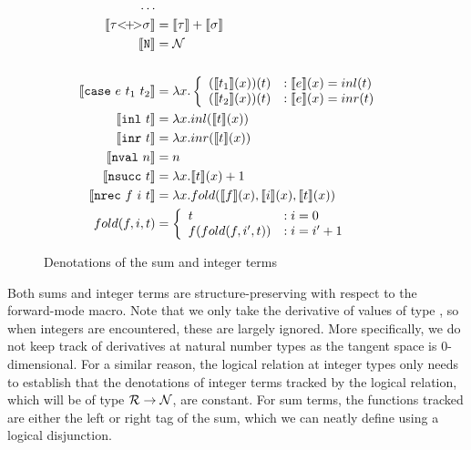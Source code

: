   \begin{figure}
    \centering
    \begin{equation*}
      \begin{split}
        \dots \\
        \llbracket \tau {<}\!{+}\!{>} \sigma \rrbracket &= \llbracket \tau \rrbracket + \llbracket \sigma \rrbracket \\
        \llbracket \texttt{N} \rrbracket &= \mathcal{N} \\
        \\
        \llbracket \texttt{case}\ e\ t_1\ t_2 \rrbracket &= \lambda x.
          \left\{
            \begin{array}{ll}
              (\llbracket t_1 \rrbracket(x))(t)
                & : \llbracket e \rrbracket(x) = inl(t) \\
              (\llbracket t_2 \rrbracket(x))(t)
                & : \llbracket e \rrbracket(x) = inr(t) \\
            \end{array}
          \right. \\
        \llbracket \texttt{inl}\ t \rrbracket &= \lambda x. inl(\llbracket t \rrbracket(x)) \\
        \llbracket \texttt{inr}\ t \rrbracket &= \lambda x. inr(\llbracket t \rrbracket(x)) \\
        \llbracket \texttt{nval}\ n \rrbracket &= n \\
        \llbracket \texttt{nsucc}\ t \rrbracket &= \lambda x. \llbracket t \rrbracket(x) + 1 \\
        \llbracket \texttt{nrec}\ f\ i\ t \rrbracket &= \lambda x. fold(\llbracket f \rrbracket(x), \llbracket i \rrbracket(x), \llbracket t \rrbracket(x)) \\
        fold(f, i, t) &=
          \left\{
            \begin{array}{ll}
              t &: i = 0 \\
              f(fold(f, i', t))
                &: i = i' + 1 \\
            \end{array}
          \right. \\
      \end{split}
    \end{equation*}
    \caption{Denotations of the sum and integer terms}
    \label{eqn:denotation_sums_prim}
  \end{figure}

  Both sums and integer terms are structure-preserving with respect to the forward-mode macro.
  Note that we only take the derivative of values of type \synR, so when integers are encountered, these are largely ignored.
  More specifically, we do not keep track of derivatives at natural number types as the tangent space is $0$-dimensional.
  For a similar reason, the logical relation at integer types only needs to establish that the denotations of integer terms tracked by the logical relation, which will be of type $\mathcal{R} \to \mathcal{N}$, are constant.
  For sum terms, the functions tracked are either the left or right tag of the sum, which we can neatly define using a logical disjunction.

